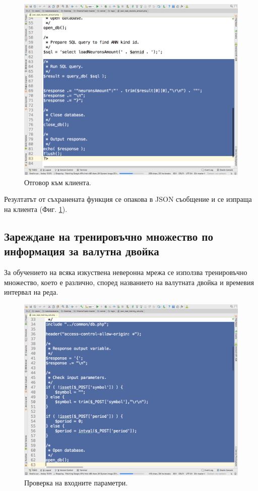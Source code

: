 \documentclass[book,14pt,oneside,openany]{memoir}
\begin{document}
\begin{figure}[h]
  \centering
  \includegraphics[height=0.45\pdfpageheight]{pic0126}
  \caption{Отговор към клиента.}
\label{fig:pic0126}
\end{figure}
\FloatBarrier

Резултатът от съхранената функция се опакова в JSON съобщение и се изпраща на клиента (Фиг. \ref{fig:pic0126}).

\subsection{Зареждане на тренировъчно множество по информация за валутна двойка}

За обучението на всяка изкуствена неверонна мрежа се използва тренировъчно множество, което е различно, според названието на валутната двойка и времевия интервал на реда. 

\begin{figure}[h]
  \centering
  \includegraphics[height=0.45\pdfpageheight]{pic0127}
  \caption{Проверка на входните параметри.}
\label{fig:pic0127}
\end{figure}
\FloatBarrier
\end{document}
